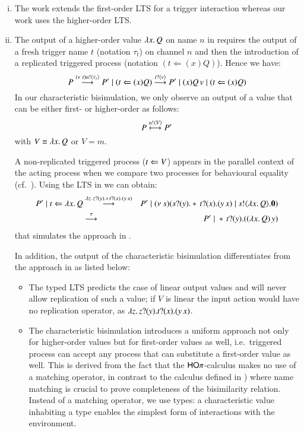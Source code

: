 \begin{enumerate}[i)]
	\item	The work \cite{JeffreyR05} extends the first-order
		LTS for a trigger interaction whereas 
		our work uses the higher-order LTS. 

	\item	The output of a higher-order value $\lambda x.\,Q$ on name
		$n$ in \cite{JeffreyR05}
		requires the output of
		a fresh trigger name $t$ (notation $\tau_t$)
		on channel $n$ 
		and then the introduction of a replicated triggered process
		(notation $(t \Leftarrow (x) Q)$). 
		Hence we have:
		\[
			P \stackrel{(\nu\ t) n ! \langle \tau_{t} \rangle}{\longrightarrow} P' \;|\; (t \Leftarrow (x) Q) \stackrel{t ? \langle v \rangle}{\longrightarrow} P' \;|\; (x) Q\,v \;|\; (t \Leftarrow (x) Q) 
		\]
	In our characteristic bisimulation, we only observe
	an output of a value that can be either first- or higher-order as follows:
		\[
			P \stackrel{n ! \langle V \rangle}{\longmapsto} P' 
		\]
		with $V \equiv \lambda x.\,Q$ or $V = m$.

		A non-replicated triggered process ($t \Leftarrow V$)
		appears in 
		the parallel context of the acting process when
		we compare two processes for behavioural equality
		(cf.~).
		Using the LTS in
		 we can obtain:
		\begin{eqnarray*}
			P' \;|\; t \Leftarrow \lambda x.\,Q
			&\stackrel{\lambda z.\,z ? (y) . \ast\,{} t ? (x) . (y\,x)}{\longrightarrow}&
			P' \;|\; (\nu\ s)(s ? (y) . \ast\,{} t ? (x) . 
(y\,x) \;|\; s ! \langle \lambda x.\,Q \rangle . \mathbf{0})\\
			&\stackrel{\tau}{\longrightarrow}&
			P' \;|\; \ast\,{}t ? (y) . ((\lambda x.\,Q)\,y)
		\end{eqnarray*}
		that simulates the approach in \cite{JeffreyR05}.

	In addition, the output of the characteristic bisimulation 
differentiates from
		the approach in \cite{JeffreyR05} as listed below:
		\begin{itemize}
			\item	The typed LTS predicts the case of linear
				output values and will never allow replication
				of such a value;
				if $V$ is linear the input action would have no replication
				operator, as
				$\lambda z.\,z ? (y) . t ? (x) . (y\,x)$.

			\item	The characteristic bisimulation introduces a uniform approach
				not only for
				higher-order values but for first-order values
				as well, i.e.~triggered process can accept any
				process that can substitute a first-order value as well.
				This is derived from the fact that the $\mathsf{HO}\pi$-calculus makes no use of a matching operator, in contrast
				to the calculus defined in \cite{JeffreyR05})
				where name matching is crucial to prove completeness
				of the bisimilarity relation.
				Instead of a matching operator, 
we use types: a characteristic value inhabiting a type
enables the simplest form of interactions 
				with the environment.


\end{itemize}
\end{enumerate}
